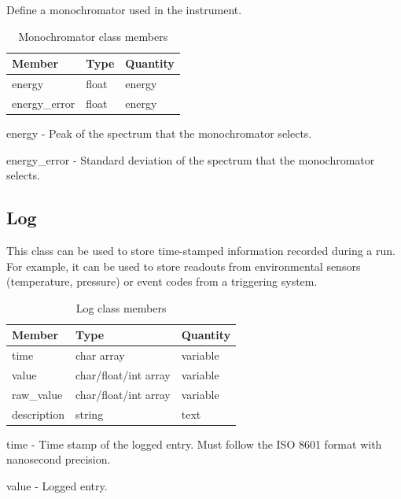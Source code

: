 \documentclass[usletter,11pt]{article}
\newcommand{\member}[2]
{ \noindent
{ \color{softBlue}  #1 - } #2
\vspace{0.2cm}
}
\begin{document}
Define a monochromator used in the instrument.

\begin{table}[h!]\sffamily \footnotesize
\caption{Monochromator class members}

\begin{tabular}{p{4.5cm} p{4.5cm}  p{2.5cm} }
\toprule
\bfseries Member     & \bfseries Type & \bfseries Quantity \\
\midrule

energy & float & energy \\
energy\_error & float & energy \\
\bottomrule
\end{tabular}
\end{table}

\member{energy}{Peak of the spectrum that the  monochromator selects.}

\member{energy\_error}{Standard deviation of the spectrum that the  monochromator selects.}

\subsection{Log}
\label{table:note}

This class can be used to store time-stamped information recorded during a run. For
example, it can be used to store readouts from environmental sensors (temperature,
pressure) or event codes from a triggering system.

\begin{table}[h!]\sffamily \footnotesize
	\caption{Log class members}
	
	\begin{tabular}{p{4.5cm} p{4.5cm}  p{2.5cm} }
		\toprule
		\bfseries Member     & \bfseries Type & \bfseries Quantity \\
		\midrule
		time & char array & variable \\
		value & char/float/int array & variable \\
		raw\_value & char/float/int array & variable \\
		description & string & text  \\
		\bottomrule
	\end{tabular}
\end{table}

\member{time}{Time stamp of the logged entry. Must follow the ISO 8601 format with
nanosecond precision.}

\member{value}{Logged entry.}
\end{document}
